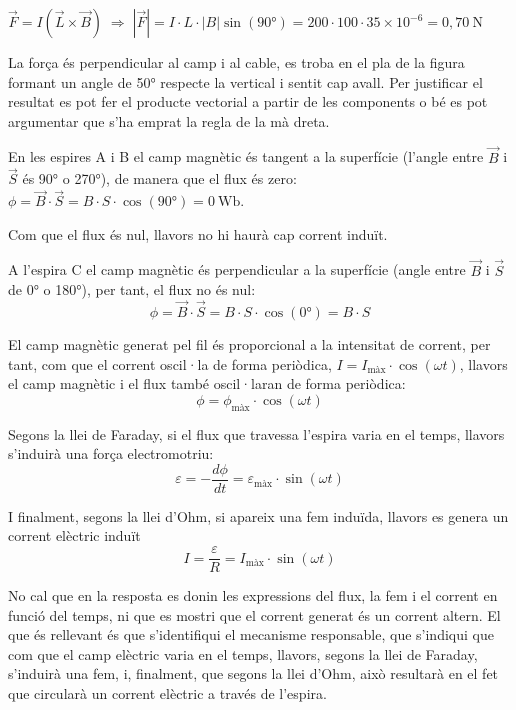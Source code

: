 \begin{solapartat}

 $\vec{F} = I(\vec{L}\times\vec{B}) \;\Rightarrow\; |\vec{F}| = I\cdot L\cdot |B|\sin(90\text{°}) = 200\cdot 100\cdot 35\times 10^{-6} = 0,70\ \mathrm{N}$

 La força és perpendicular al camp i al cable, es troba en el pla de la figura formant un angle de 50° respecte la vertical i sentit cap avall. Per justificar el resultat es pot fer el producte vectorial a partir de les components o bé es pot argumentar que s'ha emprat la regla de la mà dreta.
\end{solapartat}

\begin{solapartat}
 En les espires A i B el camp magnètic és tangent a la superfície (l'angle entre $\vec{B}$ i $\vec{S}$ és 90° o 270°), de manera que el flux és zero: $\phi = \vec{B}\cdot\vec{S} = B\cdot S\cdot\cos(90\text{°}) = 0\ \mathrm{Wb}$.

Com que el flux és nul, llavors no hi haurà cap corrent induït.

 A l'espira C el camp magnètic és perpendicular a la superfície (angle entre $\vec{B}$ i $\vec{S}$ de 0° o 180°), per tant, el flux no és nul:
\[ \phi = \vec{B}\cdot\vec{S} = B\cdot S\cdot\cos(0\text{°}) = B\cdot S \]

 El camp magnètic generat pel fil és proporcional a la intensitat de corrent, per tant, com que el corrent oscil·la de forma periòdica, $I = I_\text{màx}\cdot\cos(\omega t)$, llavors el camp magnètic i el flux també oscil·laran de forma periòdica:
\[ \phi = \phi_\text{màx}\cdot\cos(\omega t) \]

 Segons la llei de Faraday, si el flux que travessa l'espira varia en el temps, llavors s'induirà una força electromotriu:
\[ \varepsilon = -\frac{d\phi}{dt} = \varepsilon_\text{màx}\cdot\sin(\omega t) \]

 I finalment, segons la llei d'Ohm, si apareix una fem induïda, llavors es genera un corrent elèctric induït
\[ I = \frac{\varepsilon}{R} = I_\text{màx}\cdot\sin(\omega t) \]

No cal que en la resposta es donin les expressions del flux, la fem i el corrent en funció del temps, ni que es mostri que el corrent generat és un corrent altern. El que és rellevant és que s'identifiqui el mecanisme responsable, que s'indiqui que com que el camp elèctric varia en el temps, llavors, segons la llei de Faraday, s'induirà una fem, i, finalment, que segons la llei d'Ohm, això resultarà en el fet que circularà un corrent elèctric a través de l'espira.
\end{solapartat}
